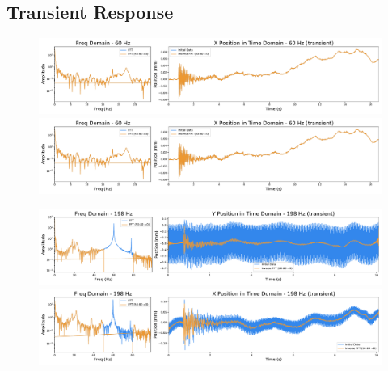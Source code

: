 \documentclass[12pt]{article}
\begin{document}
\subsection{Transient Response}

\begin{figure}[ht]
\centering
    \includegraphics[width=\textwidth]{data_02_y_pos.pdf}
	\caption{}
    \label{fig:02_y_pos}
    \includegraphics[width=\textwidth]{data_02_x_pos.pdf}
	\caption{}
    \label{fig:02_x_pos}
\end{figure}

\begin{figure}[ht]
\centering
    \includegraphics[width=\textwidth]{data_05_y_pos.pdf}
	\caption{}
    \label{fig:05_y_pos}
    \includegraphics[width=\textwidth]{data_05_x_pos.pdf}
	\caption{}
    \label{fig:05_x_pos}
\end{figure}
\end{document}
